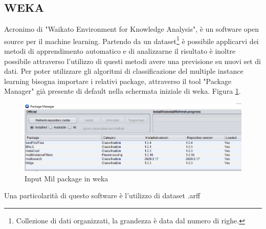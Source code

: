 \subsection{WEKA}
\label{par:weka}
Acronimo di "Waikato Environment for Knowledge Analysis", è un software open source per il machine learning. Partendo da un dataset\footnote{Collezione di dati organizzati, la grandezza è data dal numero di righe.} è possibile applicarvi dei metodi di apprendimento automatico e di analizzarne il risultato è inoltre possibile attraverso l'utilizzo di questi metodi avere una previsione su nuovi set di dati. Per poter utilizzare gli algoritmi di classificazione del multiple instance learning bisogna importare i relativi package, attraverso il tool "Package Manager" già presente di default nella schermata iniziale di weka. Figura \ref{fig:mil pckg}.
\begin{figure}[h]
\centering
    \includegraphics[width=0.9\linewidth]{imgs/capitolo4/packmil.png} 
    \caption{Input Mil package in weka}
    \label{fig:mil pckg}
\end{figure}
\FloatBarrier
Una particolarità di questo software è l'utilizzo di dataset .arff 


